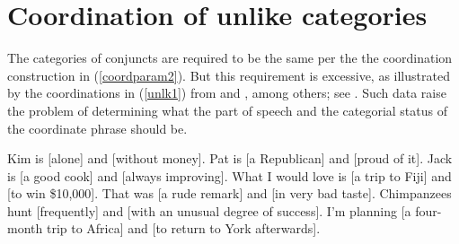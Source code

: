{\section{Coordination of unlike categories}\label{unlikessec}

The categories of conjuncts are required to be the same per the the coordination construction in (\ref{coordparam2}).
But this requirement is excessive, as illustrated by  the coordinations in (\ref{unlk1}) from
\citet[]{bayer} and %
\citet[]{rodney}, %
among  others; see \citet{Chaves2013b-u}.
 Such data raise the problem of determining what the part of speech and the categorial status of the coordinate phrase should be.

\begin{exe}
\label{unlk1}
\ex Kim is [alone] and [without money].
\ex Pat is [a Republican] and [proud of it].
\ex Jack is [a good cook] and [always improving].
\ex What I would love is [a trip to Fiji] and [to win \$10,000].
\ex That was [a rude remark] and [in very bad taste].
\ex Chimpanzees hunt [frequently] and [with an unusual degree of success].
\ex I'm planning [a four-month trip to Africa] and [to return to York afterwards].
\end{exe}

%
%
%
%
%


}
